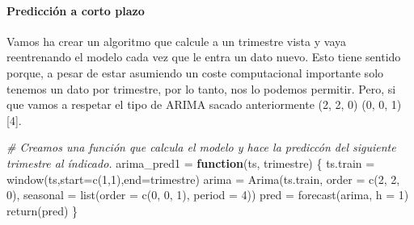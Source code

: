 \documentclass[
]{article}
\newenvironment{Shaded}{\begin{snugshade}}{\end{snugshade}}
\newcommand{\AttributeTok}[1]{\textcolor[rgb]{0.77,0.63,0.00}{#1}}
\newcommand{\CommentTok}[1]{\textcolor[rgb]{0.56,0.35,0.01}{\textit{#1}}}
\newcommand{\ControlFlowTok}[1]{\textcolor[rgb]{0.13,0.29,0.53}{\textbf{#1}}}
\newcommand{\DecValTok}[1]{\textcolor[rgb]{0.00,0.00,0.81}{#1}}
\newcommand{\FunctionTok}[1]{\textcolor[rgb]{0.00,0.00,0.00}{#1}}
\newcommand{\NormalTok}[1]{#1}
\newcommand{\OtherTok}[1]{\textcolor[rgb]{0.56,0.35,0.01}{#1}}
\begin{document}
\hypertarget{predicciuxf3n-a-corto-plazo}{%
\paragraph{Predicción a corto plazo}\label{predicciuxf3n-a-corto-plazo}}

Vamos ha crear un algoritmo que calcule a un trimestre vista y vaya
reentrenando el modelo cada vez que le entra un dato nuevo. Esto tiene
sentido porque, a pesar de estar asumiendo un coste computacional
importante solo tenemos un dato por trimestre, por lo tanto, nos lo
podemos permitir. Pero, si que vamos a respetar el tipo de ARIMA sacado
anteriormente (2, 2, 0) (0, 0, 1) {[}4{]}.

\begin{Shaded}
\begin{Highlighting}[]
\CommentTok{\# Creamos una función que calcula el modelo y hace la prediccón del siguiente trimestre al índicado.}
\NormalTok{arima\_pred1 }\OtherTok{=} \ControlFlowTok{function}\NormalTok{(ts, trimestre) \{}
\NormalTok{  ts.train }\OtherTok{=} \FunctionTok{window}\NormalTok{(ts,}\AttributeTok{start=}\FunctionTok{c}\NormalTok{(}\DecValTok{1}\NormalTok{,}\DecValTok{1}\NormalTok{),}\AttributeTok{end=}\NormalTok{trimestre)}
\NormalTok{  arima }\OtherTok{=} \FunctionTok{Arima}\NormalTok{(ts.train, }\AttributeTok{order =} \FunctionTok{c}\NormalTok{(}\DecValTok{2}\NormalTok{, }\DecValTok{2}\NormalTok{, }\DecValTok{0}\NormalTok{), }\AttributeTok{seasonal =} \FunctionTok{list}\NormalTok{(}\AttributeTok{order =} \FunctionTok{c}\NormalTok{(}\DecValTok{0}\NormalTok{, }\DecValTok{0}\NormalTok{, }\DecValTok{1}\NormalTok{),  }\AttributeTok{period =} \DecValTok{4}\NormalTok{))}
\NormalTok{  pred }\OtherTok{=} \FunctionTok{forecast}\NormalTok{(arima, }\AttributeTok{h =} \DecValTok{1}\NormalTok{)}
  \FunctionTok{return}\NormalTok{(pred)}
\NormalTok{\}}


\end{Highlighting}
\end{Shaded}
\end{document}
